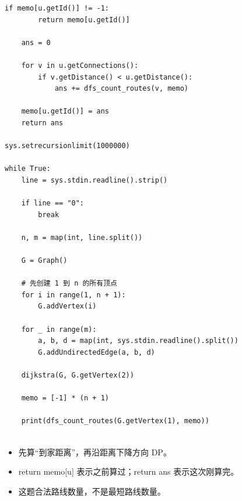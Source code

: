 \documentclass[10pt,a4paper,fontset=none]{ctexart}
\begin{document}
\begin{lstlisting}[style=py,caption={最终可用代码（对话来源）}]
    if memo[u.getId()] != -1:
        return memo[u.getId()]

    ans = 0

    for v in u.getConnections():
        if v.getDistance() < u.getDistance():
            ans += dfs_count_routes(v, memo)

    memo[u.getId()] = ans
    return ans

sys.setrecursionlimit(1000000)

while True:
    line = sys.stdin.readline().strip()

    if line == "0":
        break

    n, m = map(int, line.split())

    G = Graph()

    # 先创建 1 到 n 的所有顶点
    for i in range(1, n + 1):
        G.addVertex(i)

    for _ in range(m):
        a, b, d = map(int, sys.stdin.readline().split())
        G.addUndirectedEdge(a, b, d)
    
    dijkstra(G, G.getVertex(2))

    memo = [-1] * (n + 1)

    print(dfs_count_routes(G.getVertex(1), memo))
    

\end{lstlisting}
\begin{notebox}
\begin{itemize}
  \item 先算“到家距离”，再沿距离下降方向 DP。
  \item return memo[u] 表示之前算过；return ans 表示这次刚算完。
  \item 这题合法路线数量，不是最短路线数量。
\end{itemize}
\end{notebox}
\end{document}
